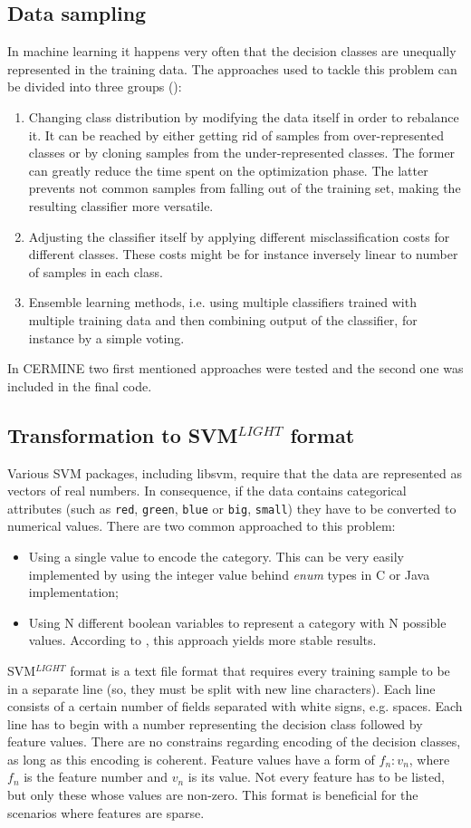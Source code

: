\subsection{Data sampling}
In machine learning it happens very often that the decision classes are unequally represented in the training data. The approaches used to tackle this problem can be divided into three groups (\cite{Choi}):
\begin{enumerate}
\item Changing class distribution by modifying the data itself in order to rebalance it. It can be reached by either getting rid of samples from over-represented classes or by cloning samples from the under-represented classes. The former can greatly reduce the time spent on the optimization phase. The latter prevents not common samples from falling out of the training set, making the resulting classifier more versatile.
\item Adjusting the classifier itself by applying different misclassification costs for different classes. These costs might be for instance inversely linear to number of samples in each class.
\item Ensemble learning methods, i.e. using multiple classifiers trained with multiple training data and then combining output of the classifier, for instance by a simple voting.
\end{enumerate}
In CERMINE two first mentioned approaches were tested and the second one was included in the final code.
\\
\subsection{Transformation to SVM$^{LIGHT}$ format}
Various SVM packages, including libsvm, require that the data are represented as vectors of real numbers. In consequence, if the data contains categorical attributes (such as \verb+red+, \verb+green+, \verb+blue+ or \verb+big+, \verb+small+) they have to be converted to numerical values. There are two common approached to this problem:
\begin{itemize}
\item Using a single value to encode the category. This can be very easily implemented by using the integer value behind \textit{enum} types in C or Java implementation;
\item Using N different boolean variables to represent a category with N possible values. According to \cite{Chih-WeiHsu2010}, this approach yields more stable results.
\end{itemize}
\qquad
SVM$^{LIGHT}$ format is a text file format that requires every training sample to be in a separate line (so, they must be split with new line characters). Each line consists of a certain number of fields separated with white signs, e.g. spaces. Each line has to begin with a number representing the decision class followed by feature values. There are no constrains regarding encoding of the decision classes, as long as this encoding is coherent. Feature values have a form of $f_n:v_n$, where $f_n$ is the feature number and $v_n$ is its value. Not every feature has to be listed, but only these whose values are non-zero. This format is beneficial for the scenarios where features are sparse.

